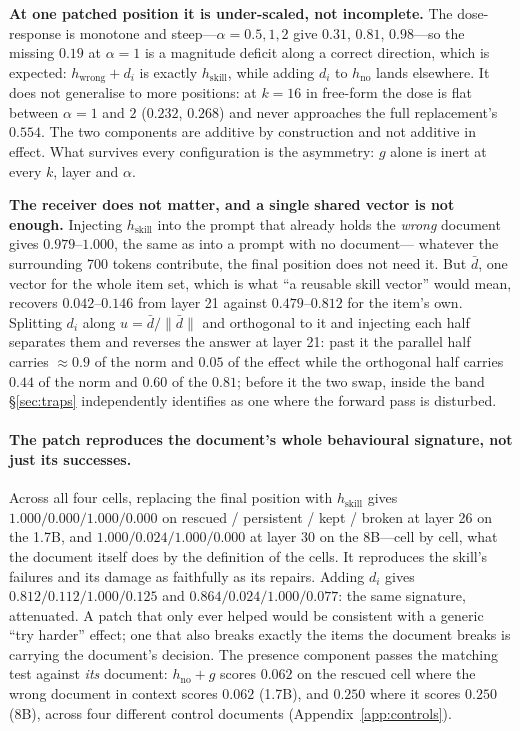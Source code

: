 \documentclass{article}
\newcommand{\dvec}{\ensuremath{d}}
\newcommand{\gvec}{\ensuremath{g}}
\begin{document}
\textbf{At one patched position it is under-scaled, not incomplete.} The
dose-response is monotone and steep---$\alpha=0.5,1,2$ give $0.31$, $0.81$,
$0.98$---so the missing $0.19$ at $\alpha=1$ is a magnitude deficit along a
correct direction, which is expected: $h_{\text{wrong}} + \dvec_i$ is exactly
$h_{\text{skill}}$, while adding $\dvec_i$ to $h_{\text{no}}$ lands elsewhere.
It does not generalise to more positions: at $k=16$ in free-form the dose is
flat between $\alpha=1$ and $2$ ($0.232$, $0.268$) and never approaches the full
replacement's $0.554$. The two components are additive by construction and not
additive in effect. What survives every configuration is the asymmetry: $\gvec$
alone is inert at every $k$, layer and $\alpha$.

\textbf{The receiver does not matter, and a single shared vector is not enough.}
Injecting $h_{\text{skill}}$ into the prompt that already holds the \emph{wrong}
document gives $0.979$--$1.000$, the same as into a prompt with no document---%
whatever the surrounding 700 tokens contribute, the final position does not need
it. But $\bar{\dvec}$, one vector for the whole item set, which is what ``a
reusable skill vector'' would mean, recovers $0.042$--$0.146$ from layer 21
against $0.479$--$0.812$ for the item's own. Splitting $\dvec_i$ along
$u=\bar{\dvec}/\|\bar{\dvec}\|$ and orthogonal to it and injecting each half
separates them and reverses the answer at layer 21: past it the parallel half
carries $\approx 0.9$ of the norm and $0.05$ of the effect while the orthogonal
half carries $0.44$ of the norm and $0.60$ of the $0.81$; before it the two swap,
inside the band \S\ref{sec:traps} independently identifies as one where the
forward pass is disturbed.

\paragraph{The patch reproduces the document's whole behavioural signature, not
just its successes.} Across all four cells, replacing the final position with
$h_{\text{skill}}$ gives $1.000 / 0.000 / 1.000 / 0.000$ on
rescued / persistent / kept / broken at layer 26 on the 1.7B, and
$1.000 / 0.024 / 1.000 / 0.000$ at layer 30 on the 8B---cell by cell, what the
document itself does by the definition of the cells. It reproduces the skill's
failures and its damage as faithfully as its repairs. Adding $\dvec_i$ gives
$0.812 / 0.112 / 1.000 / 0.125$ and $0.864 / 0.024 / 1.000 / 0.077$: the same
signature, attenuated. A patch that only ever helped would be consistent with a
generic ``try harder'' effect; one that also breaks exactly the items the
document breaks is carrying the document's decision. The presence component
passes the matching test against \emph{its} document: $h_{\text{no}}+\gvec$
scores $0.062$ on the rescued cell where the wrong document in context scores
$0.062$ (1.7B), and $0.250$ where it scores $0.250$ (8B), across four different
control documents (Appendix~\ref{app:controls}).
\end{document}
